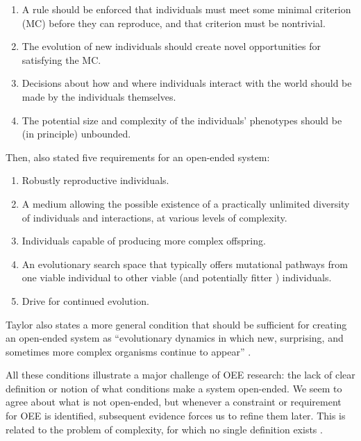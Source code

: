 \begin{enumerate}
  \item A rule should be enforced that individuals must meet some minimal
        criterion (MC) before they can reproduce, and that criterion must be
        nontrivial.
  \item The evolution of new individuals should create novel opportunities for
        satisfying the MC.
  \item Decisions about how and where individuals interact with the world should
        be made by the individuals themselves.
  \item The potential size and complexity of the individuals' phenotypes should
        be (in principle) unbounded.
\end{enumerate}
Then, \cite{taylorRequirementsOpenEndedEvolution2015} also stated five
requirements for an open-ended system:

\begin{enumerate}
  \item Robustly reproductive individuals.
  \item A medium allowing the possible existence of a practically unlimited
        diversity of individuals and interactions, at various levels of
        complexity.
  \item Individuals capable of producing more complex offspring.
  \item An evolutionary search space that typically offers mutational pathways
        from one viable individual to other viable (and potentially fitter )
        individuals.
  \item Drive for continued evolution.
\end{enumerate}
Taylor also states a more general condition that should be sufficient for
creating an open-ended system as ``evolutionary dynamics in which new,
surprising, and sometimes more complex organisms continue to appear''
\parencite{taylorRequirementsOpenEndedEvolution2015,
  taylorOpenEndedEvolutionPerspectives2016}.

All these conditions illustrate a major challenge of \ac{OEE} research: the lack
of clear definition or notion of what conditions make a system open-ended. We
seem to agree about what is not open-ended, but whenever a constraint or
requirement for \ac{OEE} is identified, subsequent evidence forces us to refine
them later. This is related to the problem of complexity, for which no single
definition exists \parencite{johnsonSimplyComplexityClear2009}.

